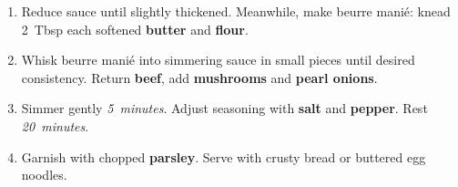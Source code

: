 \documentclass[11pt,letterpaper]{article}
\begin{document}
\begin{enumerate}
    \item Reduce sauce until slightly thickened. Meanwhile, make beurre manié: knead 2~Tbsp each softened \textbf{butter} and \textbf{flour}.
    
    \item Whisk beurre manié into simmering sauce in small pieces until desired consistency. Return \textbf{beef}, add \textbf{mushrooms} and \textbf{pearl onions}.
    
    \item Simmer gently \textit{5~minutes}. Adjust seasoning with \textbf{salt} and \textbf{pepper}. Rest \textit{20~minutes}.
    
    \item Garnish with chopped \textbf{parsley}. Serve with crusty bread or buttered egg noodles.
\end{enumerate}

\newpage
\end{document}
